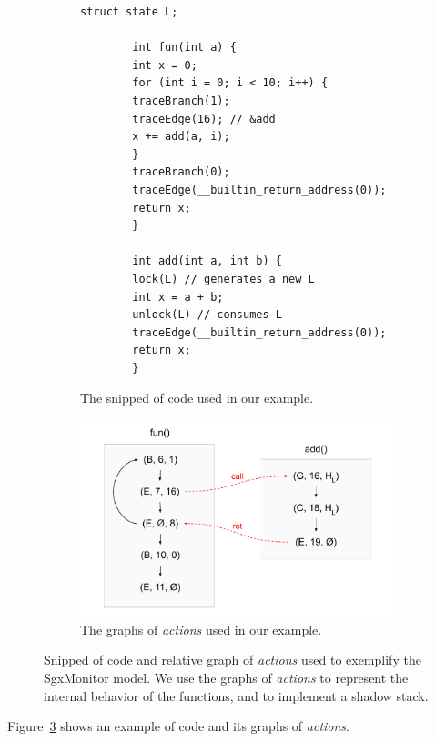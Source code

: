 \begin{figure}[t]
	\centering
	\begin{subfigure}[b]{0.48\textwidth}
		\centering
		\begin{lstlisting}[style=CStyle,escapechar=|,basicstyle=\ttfamily\tiny]
		struct state L;
		
		int fun(int a) {
		int x = 0;
		for (int i = 0; i < 10; i++) {
		traceBranch(1);
		traceEdge(16); // &add
		x += add(a, i);
		}
		traceBranch(0);
		traceEdge(__builtin_return_address(0));
		return x;
		}
		
		int add(int a, int b) {
		lock(L) // generates a new L
		int x = a + b;
		unlock(L) // consumes L
		traceEdge(__builtin_return_address(0));
		return x;
		}
		\end{lstlisting}
		\caption{The snipped of code used in our example.}
		\label{fig:running-example-code}
	\end{subfigure}
	\hfill
	\begin{subfigure}[b]{0.5\textwidth}
		\centering
		\includegraphics[width=\textwidth]{fig_c6/running-example-graph.pdf}
		\caption{The graphs of \emph{actions} used in our example.}
		\label{fig:running-example-graph}
	\end{subfigure}
	\caption[SgxMonitor running example.]{Snipped of code and relative graph of 
	\emph{actions} used to exemplify the SgxMonitor model. We use the graphs of 
	\emph{actions} to represent the internal behavior of the functions, and to 
	implement a shadow stack.}
	\label{fig:running-example}
\end{figure}

Figure~\ref{fig:running-example} shows an example of code and its graphs 
of \emph{actions}.

